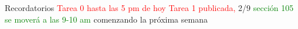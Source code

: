 \begin{frame}{Recordatorios}
    \textcolor{red}{Tarea 0 hasta las 5 pm de hoy} \newline
    \textcolor{red}{Tarea 1 publicada,} 2/9 \newline
    \textcolor{Green}{sección 105 se moverá a las 9-10 am} comenzando la próxima semana
\end{frame}